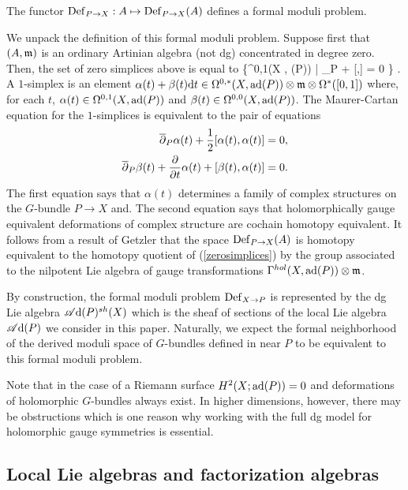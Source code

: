 \documentclass[10pt]{amsart}
\def\sAd{\sA{\rm d}}
\begin{document}
\begin{lem}
The functor ${\rm Def}_{P \to X} : A \mapsto {\rm Def}_{P \to X}(A)$ defines a formal moduli problem.
\end{lem} 

We unpack the definition of this formal moduli problem.
Suppose first that $(A, {\mathfrak m})$ is an ordinary Artinian algebra (not dg) concentrated in degree zero. 
Then, the set of zero simplices above is equal to
\be\label{zerosimplices}
\{\alpha \in \Omega^{0,1}(X , \ad(P)) \tensor \fm \; | \; \dbar_P \alpha +  [\alpha,\alpha] = 0 \} .
\ee
A $1$-simplex is an element $\alpha(t) + \beta(t) {\rm d} t \in \Omega^{0,*}(X, {\rm ad}(P)) \otimes {\mathfrak m} \otimes \Omega^*([0,1])$ where, for each $t$, $\alpha(t) \in \Omega^{0,1}(X , {\rm ad}(P))$ and $\beta(t) \in \Omega^{0,0}(X, {\rm ad}(P))$.
The Maurer-Cartan equation for the $1$-simplices is equivalent to the pair of equations
\begin{align*}
\overline{\partial}_P \alpha(t) + \frac{1}{2}[\alpha(t), \alpha(t)] & = 0 ,\\
\overline{\partial}_P \beta(t) + \frac{\partial}{\partial t} \alpha(t) + [\beta(t), \alpha(t)] & = 0 .
\end{align*}
The first equation says that $\alpha(t)$ determines a family of complex structures on the $G$-bundle $P \to X$ and.
The second equation says that holomorphically gauge equivalent deformations of complex structure are cochain homotopy equivalent. 
It follows from a result of Getzler \cite{GetzlerLie} that the space ${\rm Def}_{P \to X}(A)$ is homotopy equivalent to the homotopy quotient of (\ref{zerosimplices}) by the group associated to the nilpotent Lie algebra of gauge transformations $\Gamma^{hol}(X, {\rm ad}(P)) \otimes {\mathfrak m}$. 

By construction, the formal moduli problem ${\rm Def}_{X \to P}$ is represented by the dg Lie algebra $\sAd(P)^{sh}(X)$ which is the sheaf of sections of the local Lie algebra $\sAd(P)$ we consider in this paper. 
Naturally, we expect the formal neighborhood of the derived moduli space of $G$-bundles defined in \cite{FHK} near $P$ to be equivalent to this formal moduli problem.

Note that in the case of a Riemann surface $H^2 (X ; {\rm ad}(P)) = 0$ and deformations of holomorphic $G$-bundles always exist. 
In higher dimensions, however, there may be obstructions which is one reason why working with the full dg model for holomorphic gauge symmetries is essential. 

\subsection{Local Lie algebras and factorization algebras}
\end{document}
